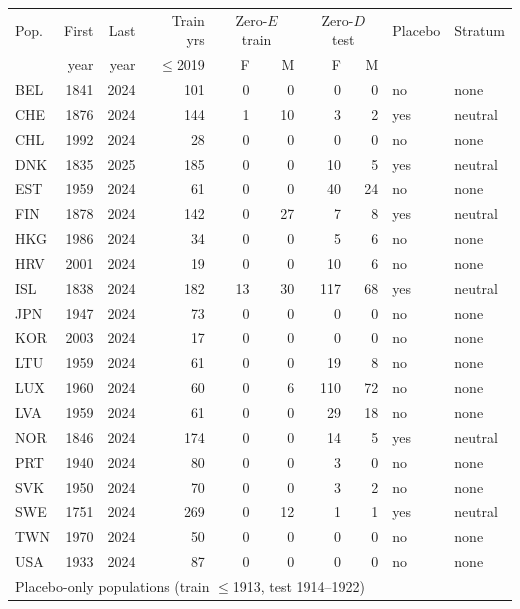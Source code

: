\begin{threeparttable}\scriptsize\renewcommand{\arraystretch}{0.90}\setlength{\tabcolsep}{2.5pt}
\begin{tabular}{@{}lrrrrrrrll@{}}
\toprule
Pop. & First & Last & Train yrs & \multicolumn{2}{c}{Zero-$E$ train} & \multicolumn{2}{c}{Zero-$D$ test} & Placebo & Stratum \\
 & year & year & $\le$2019 & F & M & F & M & & \\
\midrule
BEL & 1841 & 2024 & 101 & 0 & 0 & 0 & 0 & no & none \\
CHE & 1876 & 2024 & 144 & 1 & 10 & 3 & 2 & yes & neutral \\
CHL & 1992 & 2024 & 28 & 0 & 0 & 0 & 0 & no & none \\
DNK & 1835 & 2025 & 185 & 0 & 0 & 10 & 5 & yes & neutral \\
EST & 1959 & 2024 & 61 & 0 & 0 & 40 & 24 & no & none \\
FIN & 1878 & 2024 & 142 & 0 & 27 & 7 & 8 & yes & neutral \\
HKG & 1986 & 2024 & 34 & 0 & 0 & 5 & 6 & no & none \\
HRV & 2001 & 2024 & 19 & 0 & 0 & 10 & 6 & no & none \\
ISL & 1838 & 2024 & 182 & 13 & 30 & 117 & 68 & yes & neutral \\
JPN & 1947 & 2024 & 73 & 0 & 0 & 0 & 0 & no & none \\
KOR & 2003 & 2024 & 17 & 0 & 0 & 0 & 0 & no & none \\
LTU & 1959 & 2024 & 61 & 0 & 0 & 19 & 8 & no & none \\
LUX & 1960 & 2024 & 60 & 0 & 6 & 110 & 72 & no & none \\
LVA & 1959 & 2024 & 61 & 0 & 0 & 29 & 18 & no & none \\
NOR & 1846 & 2024 & 174 & 0 & 0 & 14 & 5 & yes & neutral \\
PRT & 1940 & 2024 & 80 & 0 & 0 & 3 & 0 & no & none \\
SVK & 1950 & 2024 & 70 & 0 & 0 & 3 & 2 & no & none \\
SWE & 1751 & 2024 & 269 & 0 & 12 & 1 & 1 & yes & neutral \\
TWN & 1970 & 2024 & 50 & 0 & 0 & 0 & 0 & no & none \\
USA & 1933 & 2024 & 87 & 0 & 0 & 0 & 0 & no & none \\
\midrule
\multicolumn{10}{l}{Placebo-only populations (train $\le$1913, test 1914--1922)} \\

\end{tabular}
\end{threeparttable}
